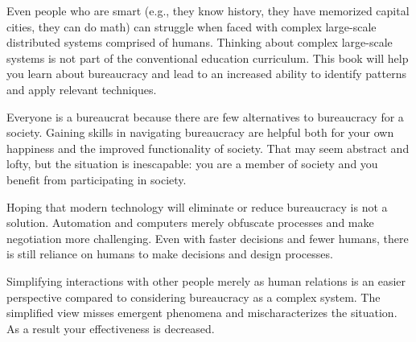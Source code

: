 Even people who are smart (e.g., they know history, they have memorized capital cities, they can do math) can struggle when faced with complex large-scale distributed systems comprised of humans. Thinking about complex large-scale systems is not part of the conventional education curriculum. This book will help you learn about bureaucracy and lead to an increased ability to identify patterns and apply relevant techniques.

Everyone is a bureaucrat because there are few alternatives to bureaucracy for a society. Gaining skills in navigating bureaucracy are helpful both for your own happiness and the improved functionality of society. That may seem abstract and lofty, but the situation is inescapable: you are a member of society and you benefit from participating in society. 

Hoping that modern technology will eliminate or reduce bureaucracy is not a solution. Automation and computers merely obfuscate processes and make negotiation more challenging. Even with faster decisions and fewer humans, there is still reliance on humans to make decisions and design processes.

Simplifying interactions with other people merely as human relations is an easier perspective compared to considering bureaucracy as a complex system.
The simplified view misses emergent phenomena and mischaracterizes the situation. As a result your effectiveness is decreased.







